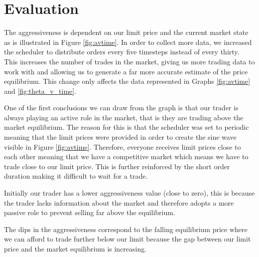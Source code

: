 \documentclass[preprint]{acm_proc_article-sp} %
\begin{document}
\section{Evaluation} \label{sec:evaluation}
 
The aggressiveness is dependent on our limit price and the current market state as
is illustrated in Figure \ref{fig:avtime}. In order to collect more data, we
increased the scheduler to distribute orders every five timesteps instead of
every thirty. This increases the number of trades in the market, giving us more trading data to work with and allowing us to generate a far more accurate estimate of the price equilibrium. This change only affects the data represented in Graphs \ref{fig:avtime} and \ref{fig:theta_v_time}.

One of the first conclusions we can draw from the graph is that our trader is
always playing an active role in the market, that is they are trading above the
market equilibrium. The reason for this is that the scheduler was set to
periodic meaning that the limit prices were provided in order to create the
sine wave visible in Figure \ref{fig:avtime}. Therefore, everyone receives limit
prices close to each other meaning that we have a competitive market which
means we have to trade close to our limit price. This is further reinforced by
the short order duration making it difficult to wait for a trade.

Initially our trader has a lower aggressiveness value (close to zero), this is
because the trader lacks information about the market and therefore adopts a
more passive role to prevent selling far above the equilibrium.

The dips in the aggressiveness correspond to the falling equilibrium price
where we can afford to trade further below our limit because the gap between
our limit price and the market equilibrium is increasing.
\end{document}

